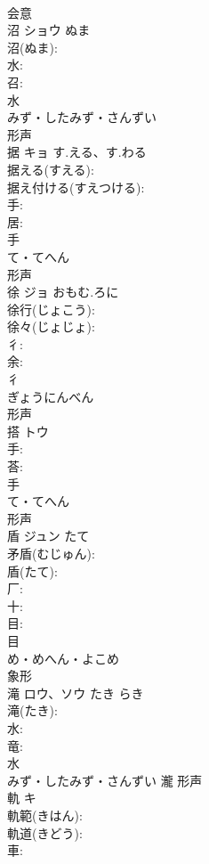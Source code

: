 \documentclass[8pt]{extreport}
\begin{document}
\begin{CJK}{UTF8}{min}
\\	会意 
\\	沼	ショウ	ぬま		
\\	沼(ぬま): 
\\	水: 
\\	召: 
\\	水	
\\	みず・したみず・さんずい	
\\	形声 
\\	据	キョ	す.える、す.わる		
\\	据える(すえる): 
\\	据え付ける(すえつける): 
\\	手: 
\\	居: 
\\	手	
\\	て・てへん	
\\	形声 
\\	徐	ジョ	おもむ.ろに		
\\	徐行(じょこう): 
\\	徐々(じょじょ): 
\\	彳: 
\\	余: 
\\	彳	
\\	ぎょうにんべん	
\\	形声 
\\	搭	トウ			
\\	手: 
\\	荅: 
\\	手	
\\	て・てへん	
\\	形声 
\\	盾	ジュン	たて		
\\	矛盾(むじゅん): 
\\	盾(たて): 
\\	厂: 
\\	十: 
\\	目: 
\\	目	
\\	め・めへん・よこめ	
\\	象形 
\\	滝	ロウ、ソウ	たき	らき	
\\	滝(たき): 
\\	水: 
\\	竜: 
\\	水	
\\	みず・したみず・さんずい	瀧	形声 
\\	軌	キ			
\\	軌範(きはん): 
\\	軌道(きどう): 
\\	車: 

\end{CJK}
\end{document}
